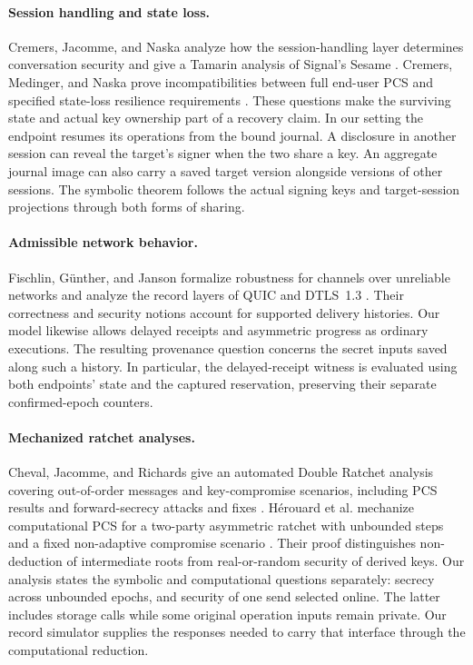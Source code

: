\paragraph{Session handling and state loss.}
Cremers, Jacomme, and Naska analyze how the session-handling layer determines
conversation security and give a Tamarin analysis of Signal's Sesame
\cite{sessionhandling2023}. Cremers, Medinger, and Naska prove incompatibilities
between full end-user PCS and specified state-loss resilience requirements
\cite{stateloss2025}. These questions make the surviving state and actual
key ownership part of a recovery claim. In our setting the endpoint
resumes its operations from the bound journal. A disclosure in another
session can reveal the target's signer when the two share a key. An
aggregate journal image can also carry a saved target version alongside
versions of other sessions. The symbolic theorem follows the actual
signing keys and target-session projections through both forms of sharing.

\paragraph{Admissible network behavior.}
Fischlin, G\"unther, and Janson formalize robustness for channels over unreliable
networks and analyze the record layers of QUIC and DTLS~1.3
\cite{robustchannels2024}. Their correctness and security notions account for
supported delivery histories. Our model likewise allows delayed receipts and
asymmetric progress as ordinary executions. The resulting provenance question
concerns the secret inputs saved along such a history. In particular, the
delayed-receipt witness is evaluated using both endpoints' state and the
captured reservation, preserving their separate confirmed-epoch counters.

\paragraph{Mechanized ratchet analyses.}
Cheval, Jacomme, and Richards give an automated Double Ratchet analysis covering
out-of-order messages and key-compromise scenarios, including PCS results and
forward-secrecy attacks and fixes \cite{doubleratchet2026}. H\'erouard et al.
mechanize computational PCS for a two-party asymmetric ratchet with unbounded
steps and a fixed non-adaptive compromise scenario \cite{squirrel2026}.
Their proof distinguishes non-deduction of intermediate roots from
real-or-random security of derived keys. Our analysis states the symbolic
and computational questions separately: secrecy across unbounded epochs,
and security of one send selected online. The latter includes storage
calls while some original operation inputs remain private. Our record
simulator supplies the responses needed to carry that interface through
the computational reduction.

